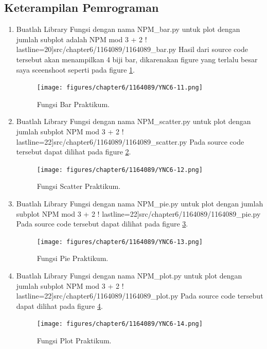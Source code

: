 \subsection{Keterampilan Pemrograman}
\begin{enumerate}

\item Buatlah Library Fungsi dengan nama NPM\_bar.py untuk plot dengan jumlah subplot adalah NPM mod 3 + 2 !
	 lastline=20]{src/chapter6/1164089/1164089_bar.py}
	\subitem Hasil dari source code tersebut akan menampilkan 4 biji bar, dikarenakan figure yang terlalu besar saya sceenshoot 				    seperti pada figure \ref{YNC6-11}.

	\begin{figure}[!htbp!]
		\centerline{\texttt{[image: figures/chapter6/1164089/YNC6-11.png]}}
		\caption{Fungsi Bar Praktikum.}
		\label{YNC6-11}
	\end{figure}

\item Buatlah Library Fungsi dengan nama NPM\_scatter.py untuk plot dengan jumlah subplot NPM mod 3 + 2 !
	 lastline=22]{src/chapter6/1164089/1164089_scatter.py}
	\subitem Pada source code tersebut dapat dilihat pada figure \ref{YNC6-12}.

	\begin{figure}[!htbp!]
		\centerline{\texttt{[image: figures/chapter6/1164089/YNC6-12.png]}}
		\caption{Fungsi Scatter Praktikum.}
		\label{YNC6-12}
	\end{figure}

\item Buatlah Library Fungsi dengan nama NPM\_pie.py untuk plot dengan jumlah subplot NPM mod 3 + 2 !
	 lastline=22]{src/chapter6/1164089/1164089_pie.py}
	\subitem Pada source code tersebut dapat dilihat pada figure \ref{YNC6-13}.

	\begin{figure}[!htbp!]
		\centerline{\texttt{[image: figures/chapter6/1164089/YNC6-13.png]}}
		\caption{Fungsi Pie Praktikum.}
		\label{YNC6-13}
	\end{figure}

\item Buatlah Library Fungsi dengan nama NPM\_plot.py untuk plot dengan jumlah subplot NPM mod 3 + 2 !
	 lastline=22]{src/chapter6/1164089/1164089_plot.py}
	\subitem Pada source code tersebut dapat dilihat pada figure \ref{YNC6-14}.

	\begin{figure}[!htbp!]
		\centerline{\texttt{[image: figures/chapter6/1164089/YNC6-14.png]}}
		\caption{Fungsi Plot Praktikum.}
		\label{YNC6-14}
	\end{figure}

\end{enumerate}

